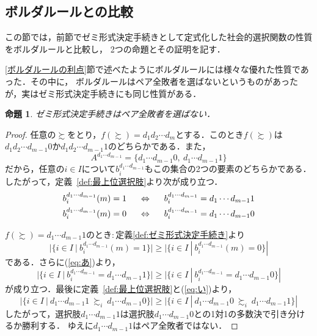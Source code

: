 \documentclass[dvipdfmx]{jsarticle}
\newtheorem{proposition}[definition]{命題}
\begin{document}
\subsection{ボルダルールとの比較}\label{subsec:ボルダルールとの比較}
この節では，前節でゼミ形式決定手続きとして定式化した社会的選択関数の性質をボルダルールと比較し，
2つの命題とその証明を記す．

\ref{ボルダルールの利点}節で述べたようにボルダルールには様々な優れた性質であった．その中に，
ボルダルールはペア全敗者を選ばないというものがあったが，実はゼミ形式決定手続きにも同じ性質がある．
\begin{proposition}
  ゼミ形式決定手続きはペア全敗者を選ばない．
\end{proposition}
\begin{proof}
  任意の$\succsim$をとり，$f(\succsim) = d_1d_2\cdots d_m$とする．このとき$f(\succsim)$は
  $d_1d_2\cdots d_{m-1}0$か$d_1d_2\cdots d_{m-1}1$のどちらかである．また，
  \begin{equation}\label{eq:い}
    A^{d_1\cdots d_{m-1}} = \{d_1\cdots d_{m-1}0,\ d_1\cdots d_{m-1}1 \}
  \end{equation}
  だから，任意の$i \in I$について$b_i^{d_1\cdots d_{m-1}}$もこの集合の2つの要素のどちらかである．
  したがって，定義~\ref{def:最上位選択肢}より次が成り立つ．
  \begin{equation}\label{eq:あ}
    \begin{gathered}
      b_{i}^{d_1\cdots d_{m-1}}(m) = 1\hspace{5mm} \Leftrightarrow \hspace{5mm} b_{i}^{d_1\cdots d_{m-1}} = d_1\cdots d_{m-1}1 \\
      b_{i}^{d_1\cdots d_{m-1}}(m) = 0\hspace{5mm} \Leftrightarrow \hspace{5mm} b_{i}^{d_1\cdots d_{m-1}} = d_1\cdots d_{m-1}0
    \end{gathered}
  \end{equation}
  
  \noindent$f(\succsim) = d_1\cdots d_{m-1}1$のとき$\colon$定義\ref{def:ゼミ形式決定手続き}より
  \[
    |\{ i \in I \ | \ b_{i}^{d_1\cdots d_{m-1}}(m)=1 \}| \geq |\{ i \in I \ | \ b_{i}^{d_1\cdots d_{m-1}}(m)=0 \}|
  \]
  である．さらに(\ref{eq:あ})より，
  \[
    |\{ i \in I \ | \ b_{i}^{d_1\cdots d_{m-1}}=d_1\cdots d_{m-1}1 \}| \geq
    |\{ i \in I \ | \ b_{i}^{d_1\cdots d_{m-1}}=d_1\cdots d_{m-1}0 \}|
  \]
  が成り立つ．最後に定義~\ref{def:最上位選択肢}と(\ref{eq:い})より，
  \[
    |\{ i \in I \ | \ d_1\cdots d_{m-1}1\ \succsim_i\ d_1\cdots d_{m-1}0 \}| \geq
    |\{ i \in I \ | \ d_1\cdots d_{m-1}0\ \succsim_i\ d_1\cdots d_{m-1}1 \}|
  \]
  したがって，選択肢$d_1\cdots d_{m-1}1$は選択肢$d_1\cdots d_{m-1}0$との1対1の多数決で引き分けるか勝利する．
  ゆえに$d_1\cdots d_{m-1}1$はペア全敗者ではない．


\end{proof}
\end{document}
